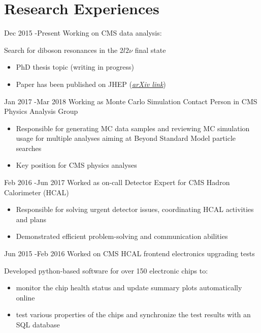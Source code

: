 \documentclass[14pt]{article} %
\begin{document}
\section{Research Experiences}
\job
{Dec 2015 -}{Present}
{Working on CMS data analysis:}
{Search for diboson resonances in the $2l2\nu$ final state
\begin{itemize}
\item PhD thesis topic (writing in progress)
\item Paper has been published on JHEP (\href{https://arxiv.org/abs/1711.04370}{\textit{arXiv link}})
\end{itemize}}
\job
{Jan 2017 -}{Mar 2018}
{Working as Monte Carlo Simulation Contact Person in CMS Physics Analysis Group}
{
\begin{itemize}
\item Responsible for generating MC data samples and reviewing MC simulation usage for multiple analyses aiming at Beyond Standard Model particle searches
\item Key position for CMS physics analyses
\end{itemize}}
\job
{Feb 2016 -}{Jun 2017}
{Worked as on-call Detector Expert for CMS Hadron Calorimeter (HCAL)}
{
\begin{itemize}
\item Responsible for solving urgent detector issues, coordinating HCAL activities and plans
\item Demonstrated efficient problem-solving and communication abilities
\end{itemize}}
\job
{Jun 2015 -}{Feb 2016}
{Worked on CMS HCAL frontend electronics upgrading tests}
{Developed python-based software for over 150 electronic chips to:
\begin{itemize}
\item monitor the chip health status and update summary plots automatically online
\item test various properties of the chips and synchronize the test results with an SQL database
\end{itemize}
}
\end{document}
